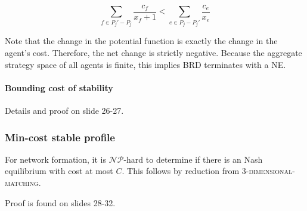 \documentclass{idc_msc}
\newcommand{\NPclass}{\mathcal{NP}}
\begin{document}
\[
\sum_{f \in P_j' - P_j} \frac{c_f}{x_f+1} < \sum_{e \in P_j - P_j'} \frac{c_e}{x_e}
\]

Note that the change in the potential function is exactly the change in the agent's cost.
Therefore, the net change is strictly negative.
Because the aggregate strategy space of all agents is finite, this implies BRD terminates with a NE.

\paragraph{Bounding cost of stability}

Details and proof on slide 26-27.

\subsubsection{Min-cost stable profile}

For network formation, it is \(\NPclass\)-hard to determine if there is an Nash equilibrium with cost at most \(C\).
This follows by reduction from \textsc{3-dimensional-matching}.

Proof is found on slides 28-32.
\end{document}
